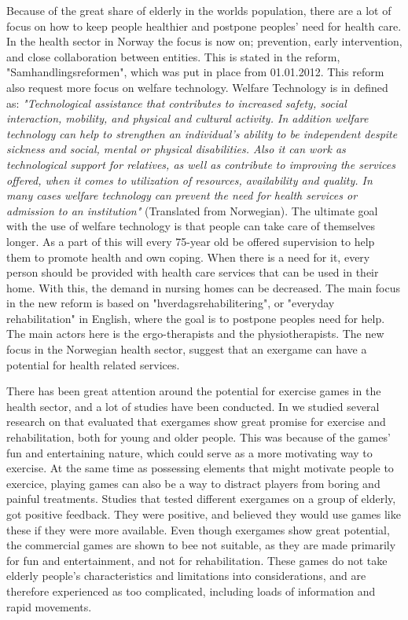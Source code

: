 Because of the great share of elderly in the worlds population, there are a lot of focus on how to keep people healthier and postpone peoples' need for health care.  In the health sector in Norway the focus is now on; prevention, early intervention, and close collaboration between entities. This is stated in the reform, "Samhandlingsreformen", which was put in place from 01.01.2012. This reform also request more focus on welfare technology. Welfare Technology is in \cite{welfare} defined as: \emph{"Technological assistance that contributes to increased safety, social interaction, mobility, and physical and cultural activity. In addition welfare technology can help to strengthen an individual's ability to be independent despite sickness and social, mental or physical disabilities. Also it can work as technological support for relatives, as well as contribute to improving the services offered, when it comes to utilization of resources, availability and quality. In many cases welfare technology can prevent the need for health services or admission to an institution"} (Translated from Norwegian). The ultimate goal with the use of welfare technology is that people can take care of themselves longer.  As a part of this will every 75-year old be offered supervision to help them to promote health and own coping. When there is a need for it, every person should be provided with health care services that can be used in their home. With this, the demand in nursing homes can be decreased. The main focus in the new reform is based on "hverdagsrehabilitering", or "everyday rehabilitation" in English, where the goal is to postpone peoples need for help. The main actors here is the ergo-therapists and the physiotherapists. The new focus in the Norwegian health sector, suggest that an exergame can have a potential for health related services.

There has been great attention around the potential for exercise games in the health sector, and a lot of studies have been conducted. In \cite{project} we studied several research on that evaluated that exergames show great promise for exercise and rehabilitation, both for young and older people. This was because of the games' fun and entertaining nature, which could serve as a more motivating way to exercise. At the same time as possessing elements that might motivate people to exercice, playing games can also be a way to distract players from boring and painful treatments. Studies that tested different exergames on a group of elderly, got positive feedback. They were positive, and believed they would use games like these if they were more available. Even though exergames show great potential, the commercial games  are shown to bee not suitable, as they are made primarily for fun and entertainment, and not for rehabilitation. These games do not take elderly people's characteristics and limitations into considerations, and are therefore experienced as too complicated, including loads of information and rapid movements.

